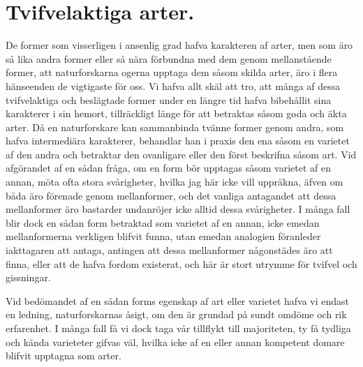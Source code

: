 \section{Tvifvelaktiga arter.}

De former som visserligen i ansenlig grad hafva karakteren af arter, men som äro så lika andra former eller så nära förbundna med dem genom mellanstående former, att naturforskarna ogerna upptaga dem såsom skilda arter, äro i flera hänseenden de vigtigaste för oss. Vi hafva allt skäl att tro, att många af dessa tvifvelaktiga och beslägtade former under en längre tid hafva bibehållit sina karakterer i sin hemort, tillräckligt länge för att betraktas såsom goda och äkta arter. Då en naturforskare kan sammanbinda tvänne former genom andra, som hafva intermediära karakterer, behandlar han i praxis den ena såsom en varietet af den andra och betraktar den ovanligare eller den först beskrifna såsom art. Vid afgörandet af en sådan fråga, om en form bör upptagas såsom varietet af en annan, möta ofta stora svårigheter, hvilka jag här icke vill uppräkna, äfven om båda äro förenade genom mellanformer, och det vanliga antagandet att dessa mellanformer äro bastarder undanröjer icke alltid dessa svårigheter. I många fall blir dock en sådan form betraktad som varietet af en annan, icke emedan mellanformerna verkligen blifvit funna, utan emedan analogien föranleder iakttagaren att antaga, antingen att dessa mellanformer någonstädes äro att finna, eller att de hafva fordom existerat, och här är stort utrymme för tvifvel och gissningar.

Vid bedömandet af en sådan forms egenskap af art eller varietet hafva vi endast en ledning, naturforskarnas åsigt, om den är grundad på sundt omdöme och rik erfarenhet. I många fall få vi dock taga vår tillflykt till majoriteten, ty få tydliga och kända varieteter gifvas väl, hvilka icke af en eller annan kompetent domare blifvit upptagna som arter.


